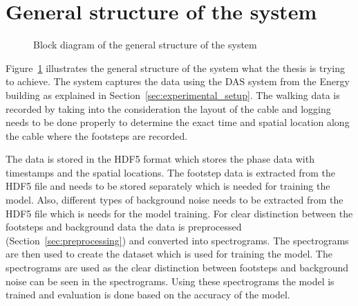 \section{General structure of the system}
\begin{figure}[ht]
    \centering
    \caption{Block diagram of the general structure of the system}
    \label{fig:footstep-pipeline}
  \end{figure}
  
  Figure~\ref{fig:footstep-pipeline} illustrates the general structure of the system what the thesis is trying to achieve. The system captures the data using the DAS system from the Energy building as explained in Section~\ref{sec:experimental_setup}. The walking data is recorded by taking into the consideration the layout of the cable and logging needs to be done properly to determine the exact time and spatial location along the cable where the footsteps are recorded. 

  The data is stored in the HDF5 format which stores the phase data with timestamps and the spatial locations. The footstep data is extracted from the HDF5 file and needs to be stored separately which is needed for training the model. Also, different types of background noise needs to be extracted from the HDF5 file which is needs for the model training. For clear distinction between the footsteps and background data the data is preprocessed (Section~\ref{sec:preprocessing}) and converted into spectrograms. The spectrograms are then used to create the dataset which is used for training the model. The spectrograms are used as the clear distinction between footsteps and background noise can be seen in the spectrograms. Using these spectrograms the model is trained and evaluation is done based on the accuracy of the model. 
  

